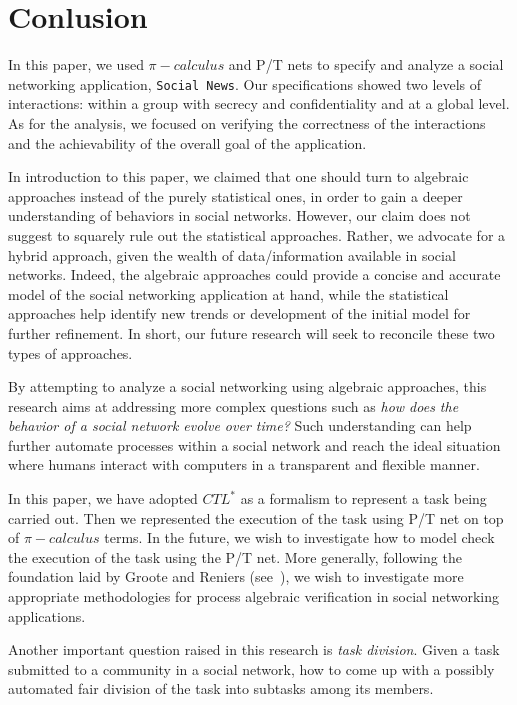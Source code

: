 \section{Conlusion} %
\label{sec:conlusion}

In this paper, we used $\pi-calculus$ and P/T nets to specify and analyze a social networking application, {\tt Social News}. Our specifications showed two levels of interactions: within a group with
secrecy and confidentiality and at a global level. As for the analysis, we focused on verifying the correctness of the interactions and the achievability of the overall goal of the application.

In introduction to this paper, we claimed that one should turn to algebraic approaches instead of the purely statistical ones, in order to gain a deeper understanding of behaviors in social networks.
However, our claim does not suggest to squarely rule out the statistical approaches. Rather, we advocate for a hybrid approach, given the wealth of data/information available in social networks.
Indeed, the algebraic approaches could provide a concise and accurate model of the social networking application at hand, while the statistical approaches help identify new trends or development of the
initial model for further refinement. In short, our future research will seek to reconcile these two types of approaches.

By attempting to analyze a social networking using algebraic approaches, this research aims at addressing more complex questions such as \emph{how does the behavior of a social network evolve over
time?} Such understanding can help further automate processes within a social network and reach the ideal situation where humans interact with computers in a transparent and flexible manner.

In this paper, we have adopted $CTL^*$ as a formalism to represent a task being carried out. Then we represented the execution of the task using P/T net on top of $\pi-calculus$ terms. In the future,
we wish to investigate how to model check the execution of the task using the P/T net. More generally, following the foundation laid by Groote and Reniers (see~\cite{Groote-Reniers:01}), we wish to
investigate more appropriate methodologies for process algebraic verification in social networking applications.

Another important question raised in this research is \emph{task division}. Given a task submitted to a community in a social network, how to come up with a possibly automated fair division of the task
into subtasks among its members.

